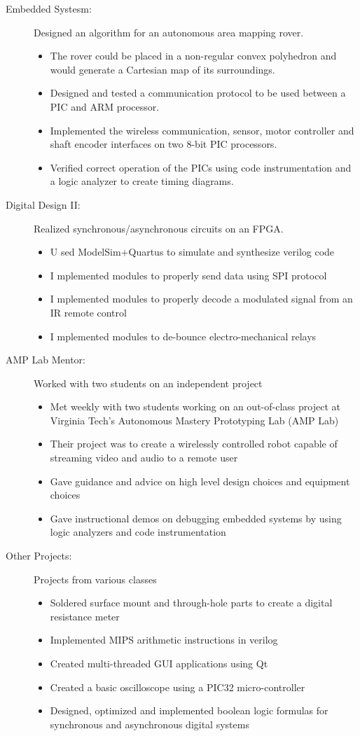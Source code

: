 \documentclass[letterpaper,11pt]{article}
\newcommand{\resitem}[1]{\item #1 \vspace{-2pt}}
\newcommand{\resheading}[1]{{\large \parashade[.9]{sharpcorners}{\textbf{#1 \vphantom{p\^{E}}}}}}
\begin{document}
\pagebreak
\resheading{School Projects}
\begin{description}
  \item[Embedded Systesm:]
    Designed an algorithm for an autonomous area mapping
    rover.
    \begin{itemize} 
        \resitem{The rover could be placed in a non-regular convex polyhedron and
        would generate a Cartesian map of its surroundings.}
        \resitem{Designed and tested a communication protocol to be used
        between a PIC and ARM processor.}
        \resitem{Implemented the wireless communication, sensor, motor controller and shaft
        encoder interfaces on two 8-bit PIC processors.}
        \resitem{Verified correct operation of the PICs using code
        instrumentation and a logic analyzer to create timing diagrams.}
    \end{itemize}
  \item[Digital Design II:] Realized synchronous/asynchronous circuits on an
    FPGA.
    \begin{itemize}
      \resitem Used ModelSim+Quartus to simulate and synthesize verilog code
      \resitem Implemented modules to properly send data using SPI protocol
      \resitem Implemented modules to properly decode a modulated signal from an
        IR remote control
      \resitem Implemented modules to de-bounce electro-mechanical relays
    \end{itemize}

  \item[AMP Lab Mentor:] Worked with two students on an independent project
    \begin{itemize}
        \resitem{Met weekly with two students working on an out-of-class project at
        Virginia Tech's Autonomous Mastery Prototyping Lab (AMP Lab)}
      \resitem {Their project was to create a wirelessly controlled robot capable
        of streaming video and audio to a remote user}
      \resitem{Gave guidance and advice on high level design choices and equipment
        choices}
      \resitem{Gave instructional demos on debugging embedded systems by using logic analyzers and code instrumentation}
  \end{itemize}

  \item[Other Projects:] Projects from various classes
    \begin{itemize}
      \resitem{Soldered surface mount and through-hole parts to create a digital
      resistance meter}
      \resitem{Implemented MIPS arithmetic instructions in verilog}
      \resitem{Created multi-threaded GUI applications using Qt}
      \resitem{Created a basic oscilloscope using a PIC32 micro-controller}
      \resitem{Designed, optimized and implemented boolean logic formulas for
      synchronous and asynchronous digital systems}
    \end{itemize}

\end{description}
\end{document}

